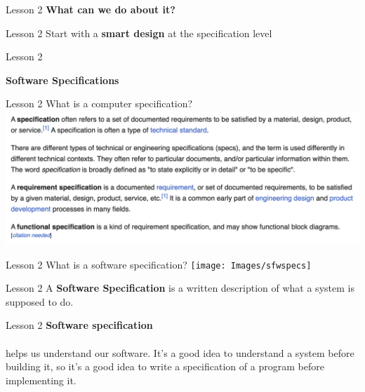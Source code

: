 \documentclass[aspectratio=1610]{beamer}
\begin{document}
\begin{frame}
\end{frame}

\begin{frame}{Lesson 2}{}
\Huge
\center
    \textbf{What can we do about it?} 
\end{frame}



\begin{frame}{Lesson 2}{}
\Huge
\center
   Start with a \textbf{smart design} at the specification level
\end{frame}


\begin{frame}{Lesson 2}{}
\begin{center}
\Huge\textbf{Software Specifications}
\end{center}
\end{frame}


\begin{frame}{Lesson 2}{}
\Huge{What is a computer specification?}
\includegraphics[scale=0.52]{Images/specs}
\end{frame}


\begin{frame}{Lesson 2}{}
\Huge{What is a software specification?}
\texttt{[image: Images/sfwspecs]}
\end{frame}


\begin{frame}{Lesson 2}{}
\Huge
	A \textbf{Software Specification} is a 
	\alert{written} description of what a system is supposed to do.
\end{frame}


\begin{frame}{Lesson 2}{}
\LARGE
\textbf{Software specification}\\~\\
helps us understand our software. It’s a good idea to understand a
system before building it, so it’s a good idea to write a specification of a program
\alert{before} implementing it.
\end{frame}
\end{document}
